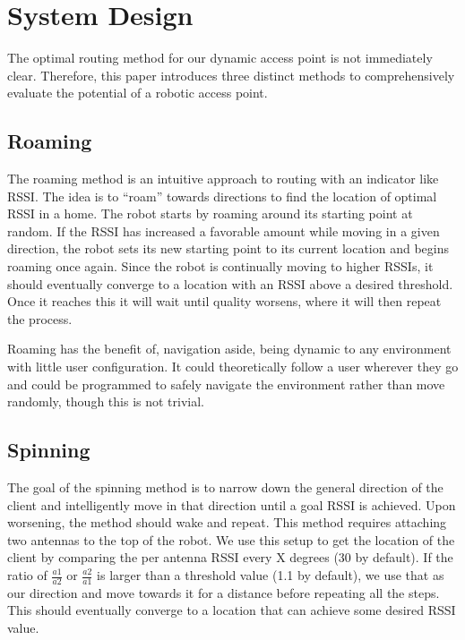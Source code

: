 \section{System Design}

The optimal routing method for our dynamic access point is not immediately clear. Therefore, this paper introduces three distinct methods to comprehensively evaluate the potential of a robotic access point.

\subsection{Roaming}

The roaming method is an intuitive approach to routing with an indicator like RSSI. The idea is to “roam” towards directions to find the location of optimal RSSI in a home. The robot starts by roaming around its starting point at random. If the RSSI has increased a favorable amount while moving in a given direction, the robot sets its new starting point to its current location and begins roaming once again. Since the robot is continually moving to higher RSSIs, it should eventually converge to a location with an RSSI above a desired threshold. Once it reaches this it will wait until quality worsens, where it will then repeat the process.\par

Roaming has the benefit of, navigation aside, being dynamic to any environment with little user configuration. It could theoretically follow a user wherever they go and could be programmed to safely navigate the environment rather than move randomly, though this is not trivial.

\subsection{Spinning}

The goal of the spinning method is to narrow down the general direction of the client and intelligently move in that direction until a goal RSSI is achieved. Upon worsening, the method should wake and repeat. This method requires attaching two antennas to the top of the robot. We use this setup to get the location of the client by comparing the per antenna RSSI every X degrees (30 by default). If the ratio of \(\frac{a1}{a2}\) or \(\frac{a2}{a1}\) is larger than a threshold value (1.1 by default), we use that as our direction and move towards it for a distance before repeating all the steps. This should eventually converge to a location that can achieve some desired RSSI value.

